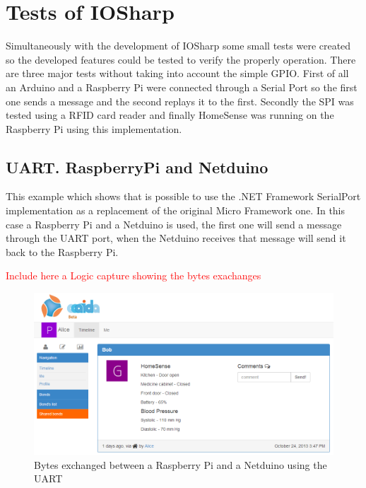 \chapter{Tests of IOSharp}\label{C:IOSharp Implementation}
Simultaneously with the development of IOSharp some small tests were created so the developed features could be tested to verify the properly operation. There are three major tests without taking into account the simple GPIO. First of all an Arduino and a Raspberry Pi were connected through a Serial Port so the first one sends a message and the second replays it to the first.  Secondly the SPI was tested using a RFID card reader and finally HomeSense was running on the Raspberry Pi using this implementation.

\section{UART. RaspberryPi and Netduino}\label{S:IOEx-UART}
This example which shows that is possible to use the .NET Framework SerialPort implementation as a replacement of the original Micro Framework one. In this case a Raspberry Pi and a Netduino is used, the first one will send a message through the UART port, when the Netduino receives that message will send it back to the Raspberry Pi.

\textcolor{red}{Include here a Logic capture showing the bytes exachanges}

\begin{figure}[H]\begin{center}
 \centering
  \captionsetup{justification=centering}
  \includegraphics[width=1\textwidth]{pictures/proposal/aaaida-use-case}
  \caption{Bytes exchanged between a Raspberry Pi and a Netduino using the UART \label{fig:IOEx-UART}}
\end{center}\end{figure}

